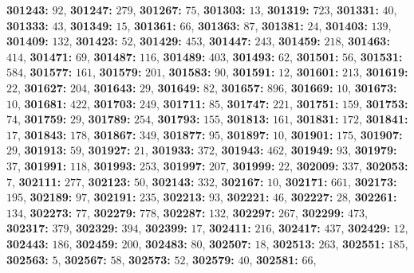 \textsf{\bfseries 301243:} $92$, \textsf{\bfseries 301247:} $279$, \textsf{\bfseries 301267:} $75$, \textsf{\bfseries 301303:} $13$, \textsf{\bfseries 301319:} $723$, \textsf{\bfseries 301331:} $40$, \textsf{\bfseries 301333:} $43$, \textsf{\bfseries 301349:} $15$, \textsf{\bfseries 301361:} $66$, \textsf{\bfseries 301363:} $87$, \textsf{\bfseries 301381:} $24$, \textsf{\bfseries 301403:} $139$, \textsf{\bfseries 301409:} $132$, \textsf{\bfseries 301423:} $52$, \textsf{\bfseries 301429:} $453$, \textsf{\bfseries 301447:} $243$, \textsf{\bfseries 301459:} $218$, \textsf{\bfseries 301463:} $414$, \textsf{\bfseries 301471:} $69$, \textsf{\bfseries 301487:} $116$, \textsf{\bfseries 301489:} $403$, \textsf{\bfseries 301493:} $62$, \textsf{\bfseries 301501:} $56$, \textsf{\bfseries 301531:} $584$, \textsf{\bfseries 301577:} $161$, \textsf{\bfseries 301579:} $201$, \textsf{\bfseries 301583:} $90$, \textsf{\bfseries 301591:} $12$, \textsf{\bfseries 301601:} $213$, \textsf{\bfseries 301619:} $22$, \textsf{\bfseries 301627:} $204$, \textsf{\bfseries 301643:} $29$, \textsf{\bfseries 301649:} $82$, \textsf{\bfseries 301657:} $896$, \textsf{\bfseries 301669:} $10$, \textsf{\bfseries 301673:} $10$, \textsf{\bfseries 301681:} $422$, \textsf{\bfseries 301703:} $249$, \textsf{\bfseries 301711:} $85$, \textsf{\bfseries 301747:} $221$, \textsf{\bfseries 301751:} $159$, \textsf{\bfseries 301753:} $74$, \textsf{\bfseries 301759:} $29$, \textsf{\bfseries 301789:} $254$, \textsf{\bfseries 301793:} $155$, \textsf{\bfseries 301813:} $161$, \textsf{\bfseries 301831:} $172$, \textsf{\bfseries 301841:} $17$, \textsf{\bfseries 301843:} $178$, \textsf{\bfseries 301867:} $349$, \textsf{\bfseries 301877:} $95$, \textsf{\bfseries 301897:} $10$, \textsf{\bfseries 301901:} $175$, \textsf{\bfseries 301907:} $29$, \textsf{\bfseries 301913:} $59$, \textsf{\bfseries 301927:} $21$, \textsf{\bfseries 301933:} $372$, \textsf{\bfseries 301943:} $462$, \textsf{\bfseries 301949:} $93$, \textsf{\bfseries 301979:} $37$, \textsf{\bfseries 301991:} $118$, \textsf{\bfseries 301993:} $253$, \textsf{\bfseries 301997:} $207$, \textsf{\bfseries 301999:} $22$, \textsf{\bfseries 302009:} $337$, \textsf{\bfseries 302053:} $7$, \textsf{\bfseries 302111:} $277$, \textsf{\bfseries 302123:} $50$, \textsf{\bfseries 302143:} $332$, \textsf{\bfseries 302167:} $10$, \textsf{\bfseries 302171:} $661$, \textsf{\bfseries 302173:} $195$, \textsf{\bfseries 302189:} $97$, \textsf{\bfseries 302191:} $235$, \textsf{\bfseries 302213:} $93$, \textsf{\bfseries 302221:} $46$, \textsf{\bfseries 302227:} $28$, \textsf{\bfseries 302261:} $134$, \textsf{\bfseries 302273:} $77$, \textsf{\bfseries 302279:} $778$, \textsf{\bfseries 302287:} $132$, \textsf{\bfseries 302297:} $267$, \textsf{\bfseries 302299:} $473$, \textsf{\bfseries 302317:} $379$, \textsf{\bfseries 302329:} $394$, \textsf{\bfseries 302399:} $17$, \textsf{\bfseries 302411:} $216$, \textsf{\bfseries 302417:} $437$, \textsf{\bfseries 302429:} $12$, \textsf{\bfseries 302443:} $186$, \textsf{\bfseries 302459:} $200$, \textsf{\bfseries 302483:} $80$, \textsf{\bfseries 302507:} $18$, \textsf{\bfseries 302513:} $263$, \textsf{\bfseries 302551:} $185$, \textsf{\bfseries 302563:} $5$, \textsf{\bfseries 302567:} $58$, \textsf{\bfseries 302573:} $52$, \textsf{\bfseries 302579:} $40$, \textsf{\bfseries 302581:} $66$, 
